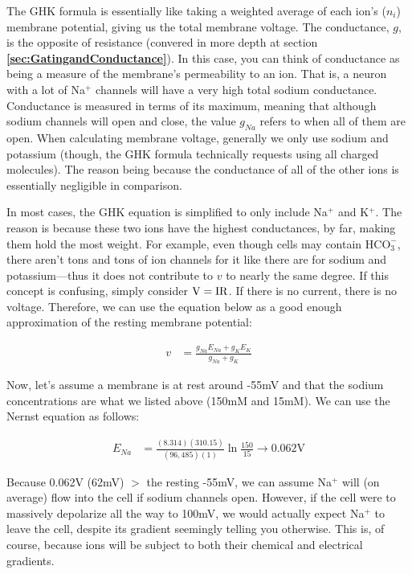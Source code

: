 \documentclass[12pt]{report}
\newcommand{\V}{{\rm V}}
\begin{document}
The GHK formula is essentially like taking a weighted average of each ion's ($n_i$) membrane potential, giving us the total membrane voltage. The conductance, $g$, is the opposite of resistance (convered in more depth at section \textbf{\ref{sec:GatingandConductance}}). In this case, you can think of conductance as being a measure of the membrane's permeability to an ion. That is, a neuron with a lot of Na$^+$ channels will have a very high total sodium conductance. Conductance is measured in terms of its maximum, meaning that although sodium channels will open and close, the value $g_{Na}$ refers to when all of them are open. When calculating membrane voltage, generally we only use sodium and potassium (though, the GHK formula technically requests using all charged molecules). The reason being because the conductance of all of the other ions is essentially negligible in comparison.\newline

In most cases, the GHK equation is simplified to only include Na$^+$ and K$^+$. The reason is because these two ions have the highest conductances, by far, making them hold the most weight. For example, even though cells may contain $\mathrm{HCO}_3^-$, there aren't tons and tons of ion channels for it like there are for sodium and potassium---thus it does not contribute to $v$ to nearly the same degree. If this concept is confusing, simply consider $\V = \mathrm{IR}$. If there is no current, there is no voltage. Therefore, we can use the equation below as a good enough approximation of the resting membrane potential:

\begin{equation} \label{GHK2}
\begin{split}
v &= \frac{g_{Na}E_{Na} + g_{K}E_{K}}{g_{Na} + g_{K}}
\end{split}
\end{equation}

Now, let's assume a membrane is at rest around -55mV and that the sodium concentrations are what we listed above (150mM and 15mM). We can use the Nernst equation as follows: 

\begin{equation} \label{Nernst1}
\begin{split}
E_{Na} &= \frac{(8.314)(310.15)}{(96,485)(1)}\ln\frac{150}{15} \rightarrow 0.062\mathrm{V}
\end{split}
\end{equation}

Because 0.062V (62mV) $>$ the resting -55mV, we can assume Na$^+$ will (on average) flow into the cell if sodium channels open. However, if the cell were to massively depolarize all the way to 100mV, we would actually expect Na$^+$ to leave the cell, despite its gradient seemingly telling you otherwise. This is, of course, because ions will be subject to both their chemical and electrical gradients. 
\end{document}

